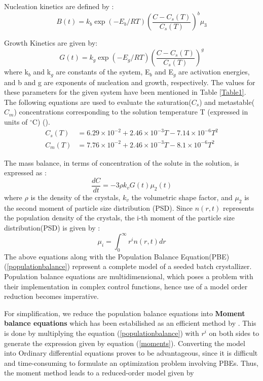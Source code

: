 \documentclass[3p,times,authoryear]{elsarticle}
\begin{document}
Nucleation kinetics are defined by :
\begin{equation}
B(t) = k_{b}\exp{\left(-E_{b}/RT \right)}\left(\frac{C - C_{s}(T)}{C_{s}(T)}\right)^{b}\mu_{3}
\end{equation}  


Growth Kinetics are given by:
\begin{equation}
G(t) = k_{g}\exp{\left(-E_{g}/RT \right)}\left(\frac{C - C_{s}(T)}{C_{s}(T)}\right)^{g}
\end{equation}
where k$_{b}$ and k$_{g}$ are constants of the system, E$_{b}$ and E$_{g}$ are activation energies, and b and g are exponents of nucleation and growth, respectively. The values for these parameters for the given system have been mentioned in Table \ref{Table1}. The following equations are used to evaluate the saturation($C_{s}$) and metastable($C_{m}$) concentrations corresponding to the solution temperature T (expressed in units of $^\circ$C) (\cite{shi}). \\
\begin{align}
C_{s}(T) &= 6.29\times10^{-2} + 2.46\times10^{-3}T - 7.14\times10^{-6}T^{2} \label{sat}\\
C_{m}(T) &= 7.76\times10^{-2} + 2.46\times10^{-3}T - 8.1\times10^{-6}T^{2} \label{meta}
\end{align}

 
The mass balance, in terms of concentration of the solute in the solution, is expressed as :
\begin{equation}
\frac{dC}{dt} = -3\rho{}k_{v}G(t)\mu_{2}(t)
\end{equation}
where $\rho{}$ is the density of the crystals, $k_{v}$ the volumetric shape factor, and $\mu_{2}$ is the second moment of particle size distribution (PSD).
Since $n(r,t)$ represents the population density of the crystals, the i-th moment of the particle size distribution(PSD) is given by :
\begin{equation} \label{moments}
\mu_{i} = \int_{0}^{\infty} r^{i}n(r,t) dr
\end{equation}
The above equations along with the Population Balance Equation(PBE) (\ref{populationbalance}) represent a complete model of a seeded batch crystallizer. 
Population balance equations are multidimensional, which poses a problem with their implementation in complex control functions, hence use of a model order reduction becomes imperative.\par
For simplification, we reduce the population balance equations into \textbf{Moment balance equations} which has been estabilished as an efficient method by \cite{yenkie}. This is done by multiplying the equation (\ref{populationbalance})  with $r^{i}$ on both sides to generate the expression given by equation (\ref{moments}). Converting the model into Ordinary differential equations proves to be advantageous, since it is difficult and time-consuming to formulate an optimization problem involving PBEs. Thus, the moment method leads to a reduced-order model given by 
\end{document}
